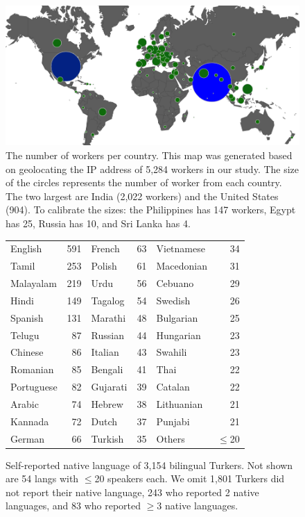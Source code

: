 \documentclass[11pt]{article}
\begin{document}
\begin{figure}[h]
\centering
\includegraphics[width=\linewidth]{figures/turkermap-color-cropped}
\caption{The number of workers per country.  This map was generated based on geolocating the IP address of  5,284 workers in our study.  The size of the circles represents the number of worker from each country.  The two largest are India (2,022 workers) and the United States (904).  To calibrate the sizes: the Philippines has 147 workers, Egypt has 25, Russia has 10, and Sri Lanka has 4.}
\label{map}
\end{figure}


\begin{figure}[h]
\footnotesize
\begin{tabular}{lrlrlr}\hline\hline
\hline
English&591&	French&63&	Vietnamese&34\\
Tamil&253&	Polish&61&	Macedonian&31\\
Malayalam&219&	Urdu&56&	Cebuano&29\\
Hindi&149&	Tagalog&54&	Swedish&26\\
Spanish&131&	Marathi&48&	Bulgarian&25\\
Telugu&87&	Russian&44&	Hungarian&23\\
Chinese&86&	Italian&43&	Swahili&23\\
Romanian&85&	Bengali&41&	Thai&22\\
Portuguese&82&	Gujarati&39&	Catalan&22\\
Arabic&74&	Hebrew&38&	Lithuanian&21\\
Kannada&72&	Dutch&37&	Punjabi&21\\
German&66&	Turkish&35&	Others &$\leq$20\\
\hline\hline
\end{tabular}
\normalsize
\caption{Self-reported native language of 3,154 bilingual Turkers. Not shown are 54 langs with $\leq$20 speakers  each. 
We omit 1,801 Turkers did not report their native language, 243 who reported 2 native languages, and 83 who reported $\geq$3 native languages.}\label{lang-pie}
\end{figure}
\end{document}
